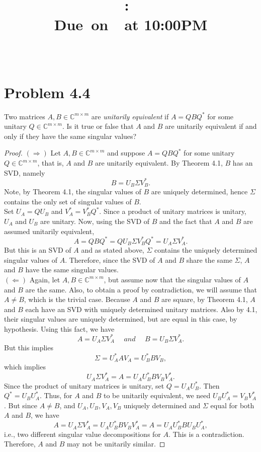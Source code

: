 \documentclass{article}
\title{
    \vspace{2in}
    \textmd{\textbf{\hmwkClass:\ \hmwkTitle}}\\
    \normalsize\vspace{0.1in}\small{Due\ on\ \hmwkDueDate\ at 10:00PM}\\
    \vspace{0.1in}\large{\textit{\hmwkClassInstructor\ \hmwkClassTime}}
    \vspace{3in}
}
\author{\hmwkAuthorName}
\date{}
\begin{document}
\maketitle

\pagebreak
\section*{Problem 4.4}
Two matrices $A, B \in \mathbb{C}^{m \times m}$ are \textit{unitarily equivalent} if $A = QBQ^*$ for some unitary $Q \in \mathbb{C}^{m\times m}$. Is it true or false that $A$ and $B$ are unitarily equivalent if and only if they have the same singular values?\\

\begin{proof}
    $(\Rightarrow)$ Let $A, B \in \mathbb{C}^{m \times m}$ and suppose $A = QBQ^*$ for some unitary $Q \in \mathbb{C}^{m\times m}$, that is, $A$ and $B$ are unitarily equivalent. By Theorem 4.1, $B$ has an SVD, namely \[B = U_B \Sigma V_B^*.\] Note, by Theorem 4.1, the singular values of $B$ are uniquely determined, hence $\Sigma$ contains the only set of singular values of $B$.\\
    
    Set $U_A = QU_B$ and $V_A^* = V_B^*Q^*$. Since a product of unitary matrices is unitary, $U_A$ and $U_B$ are unitary. Now, using the SVD of $B$ and the fact that $A$ and $B$ are assumed unitarily equivalent, \[A = QBQ^* = QU_B \Sigma V_B^*Q^* = U_A\Sigma V_A^*.\] But this is an SVD of $A$ and as stated above, $\Sigma$ contains the uniquely determined singular values of $A$. Therefore, since the SVD of $A$ and $B$ share the same $\Sigma$, $A$ and $B$ have the same singular values.\\

    $(\Leftarrow)$ Again, let $A, B \in \mathbb{C}^{m \times m}$, but assume now that the singular values of $A$ and $B$ are the same. Also, to obtain a proof by contradiction, we will assume that $A \neq B$, which is the trivial case. Because $A$ and $B$ are square, by Theorem 4.1, $A$ and $B$ each have an SVD with uniquely determined unitary matrices. Also by 4.1, their singular values are uniquely determined, but are equal in this case, by hypothesis. Using this fact, we have \[A = U_A\Sigma V_A^* ~~~~~~ and ~~~~~~ B = U_B\Sigma V_A^*.\] But this implies \[\Sigma = U_A^*AV_A = U_B^*BV_B,\] which implies \[U_A \Sigma V_A^* = A = U_AU_B^*BV_BV_A^*.\] Since the product of unitary matrices is unitary, set $Q = U_AU_B^*$. Then $Q^* = U_BU_A^*$. Thus, for $A$ and $B$ to be unitarily equivalent, we need $U_BU_A^* = V_BV_A^*$. But since $A \neq B$, and $U_A, U_B, V_A, V_B$ uniquely determined and $\Sigma$ equal for both $A$ and $B$, we have \[A = U_A \Sigma V_A^* = U_AU_B^*BV_BV_A^* = A = U_AU_B^*BU_BU_A^*,\] i.e., two different singular value decompositions for $A$. This is a contradiction. Therefore, $A$ and $B$ may not be unitarily similar.


\end{proof}
\end{document}

